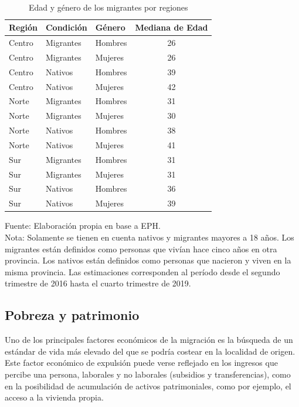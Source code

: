 \documentclass[12pt,a4paper]{article}
\begin{document}
\begin{table}[htbp!]
\caption{\\Edad y género de los migrantes por regiones} 
\centering
\footnotesize
\begin{tabular}{lllc}
  \hline
  \hline
Región & Condición & Género & Mediana de Edad \\ 
  \hline
  \hline
 Centro & Migrantes & Hombres & 26 \\ 
 Centro & Migrantes & Mujeres & 26 \\ 
 Centro & Nativos & Hombres & 39 \\ 
 Centro & Nativos & Mujeres & 42 \\ 
 Norte & Migrantes & Hombres & 31\\ 
 Norte & Migrantes & Mujeres & 30 \\ 
 Norte & Nativos & Hombres & 38 \\ 
 Norte & Nativos & Mujeres & 41 \\ 
 Sur & Migrantes & Hombres & 31 \\ 
 Sur & Migrantes & Mujeres & 31 \\ 
 Sur & Nativos & Hombres & 36\\ 
 Sur & Nativos & Mujeres & 39 \\ 
   \hline
\end{tabular}
\label{cuadro:edad_mig}
\begin{flushleft}
\begin{scriptsize}
Fuente: Elaboración propia en base a EPH.\\
Nota: Solamente se tienen en cuenta nativos y migrantes mayores a 18 años. Los migrantes están definidos como personas que vivían hace cinco años en otra provincia. Los nativos están definidos como personas que nacieron y viven en la misma provincia. Las estimaciones corresponden al período desde el segundo trimestre de 2016 hasta el cuarto trimestre de 2019.\\
\end{scriptsize}
\end{flushleft}
\end{table}


\newpage
\subsection{Pobreza y patrimonio}

Uno de los principales factores económicos de la migración es la búsqueda de un estándar de vida más elevado del que se podría costear en la localidad de origen. Este factor económico de expulsión puede verse reflejado en los ingresos que percibe una persona, laborales y no laborales (subsidios y transferencias), como en la posibilidad de acumulación de activos patrimoniales, como por ejemplo, el acceso a la vivienda propia.
\end{document}
